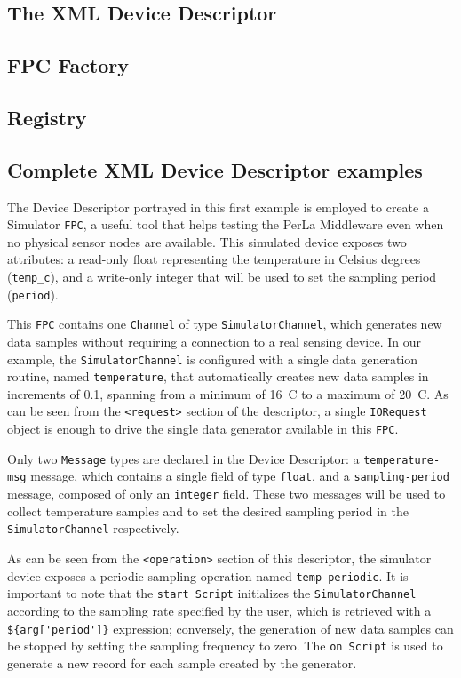 \subsection{The XML Device Descriptor}

\subsection{FPC Factory}

\subsection{Registry}


\subsection{Complete XML Device Descriptor examples}

The Device Descriptor portrayed in this first example is employed to create a
Simulator \texttt{FPC}, a useful tool that helps testing the PerLa Middleware
even when no physical sensor nodes are available. This simulated device exposes
two attributes: a read-only float representing the temperature in Celsius
degrees (\texttt{temp\_c}), and a write-only integer that will be used to set
the sampling period (\texttt{period}).

This \texttt{FPC} contains one \texttt{Channel} of type
\texttt{SimulatorChannel}, which generates new data samples without requiring a
connection to a real sensing device. In our example, the
\texttt{SimulatorChannel} is configured with a single data generation routine,
named \texttt{temperature}, that automatically creates new data samples in
increments of 0.1\degree, spanning from a minimum of 16\degree~C to a maximum
of 20\degree~C. As can be seen from the \lstinline!<request>! section of the
descriptor, a single \texttt{IORequest} object is enough to drive the single
data generator available in this \texttt{FPC}.

Only two \texttt{Message} types are declared in the Device Descriptor: a
\texttt{temperature-msg} message, which contains a single field of type
\texttt{float}, and a \texttt{sampling-period} message, composed of only an
\texttt{integer} field. These two messages will be used to collect temperature
samples and to set the desired sampling period in the \texttt{SimulatorChannel}
respectively.

As can be seen from the \lstinline!<operation>! section of this descriptor, the
simulator device exposes a periodic sampling operation named
\texttt{temp-periodic}. It is important to note that the \texttt{start Script}
initializes the \texttt{SimulatorChannel} according to the sampling rate
specified by the user, which is retrieved with a \lstinline!${arg['period']}!
expression; conversely, the generation of new data samples can be stopped by
setting the sampling frequency to zero. The \texttt{on Script} is used to
generate a new record for each sample created by the generator.

